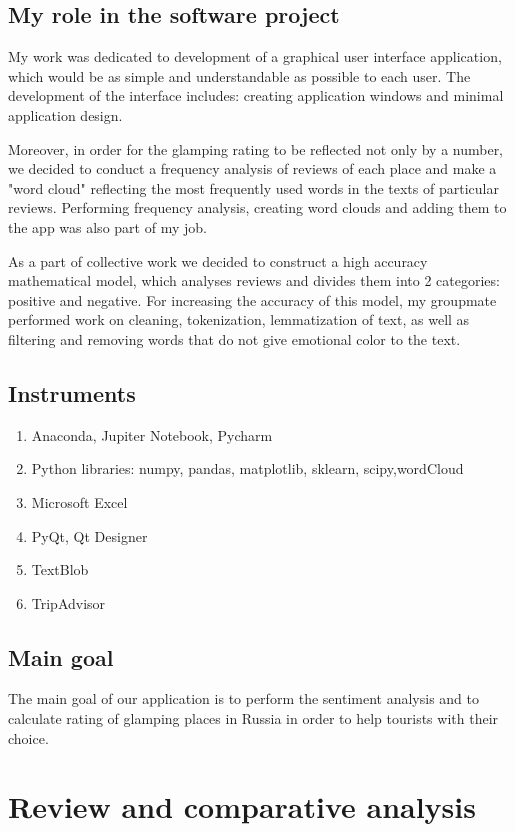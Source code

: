 \documentclass[]{article}
\begin{document}
\subsection{My role in the software project}
My work was dedicated to development of a graphical user interface application, which would be as simple and understandable as possible to each user. The development of the interface includes: creating application windows and minimal application design.

Moreover, in order for the glamping rating to be reflected not only by a number, we decided to conduct a frequency analysis of reviews of each place and make a "word cloud" reflecting the most frequently used words in the texts of particular reviews. Performing frequency analysis, creating word clouds and adding them to the app was also part of my job.

As a part of collective work we decided to construct a high accuracy mathematical model, which analyses reviews and divides them into 2 categories: positive and negative. For increasing the accuracy of this model, my groupmate performed work on cleaning, tokenization, lemmatization of text, as well as filtering and removing words that do not give emotional color to the text.

\subsection{Instruments}

\begin{enumerate} 
	\item Anaconda, Jupiter Notebook, Pycharm
	\item Python libraries: numpy, pandas, matplotlib, sklearn, scipy,wordCloud
	\item Microsoft Excel
	\item PyQt, Qt Designer
	\item TextBlob
	\item TripAdvisor
	
\end{enumerate}

\subsection{Main goal}
The main goal of our application is to perform the sentiment analysis and to calculate rating of glamping places in Russia in order to help tourists with their choice.

\section{Review and comparative analysis}
\end{document}
